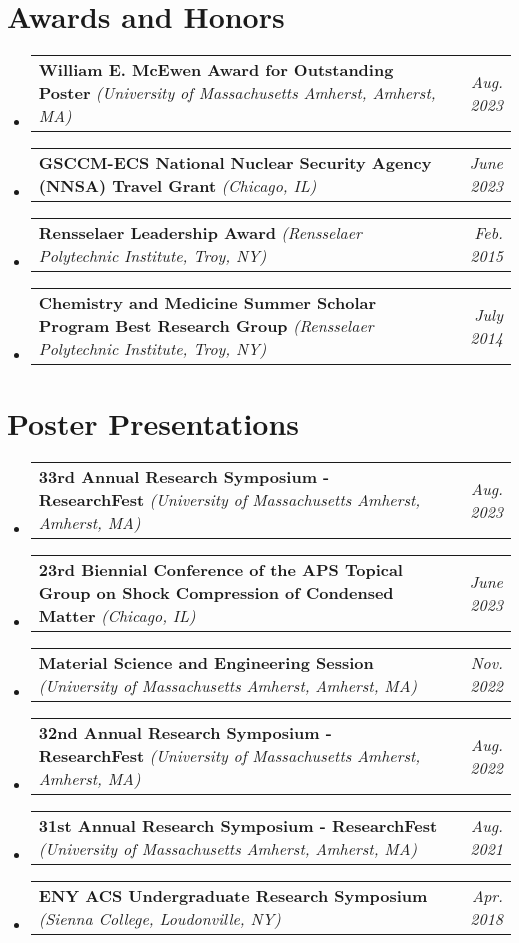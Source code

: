 \documentclass[letterpaper,11pt]{article}
\makeatletter
\newcommand{\award}[3]{
    \vspace{-2pt}
    \scriptsize
    \item[]
    \begin{tabularx}{\textwidth}{l@{\extracolsep{\fill}}r}
        \textbf{#1} \textit{(#2)} & \textit{#3} \\
    \end{tabularx}\vspace{-12pt}
}
\newcommand{\presentation}[3]{
    \vspace{-2pt}
    \scriptsize
    \item[]
    \begin{tabularx}{\textwidth}{l@{\extracolsep{\fill}}r}
        \textbf{#1} \textit{(#2)} & \textit{#3} \\
    \end{tabularx}\vspace{-12pt}
}
\makeatother
\begin{document}
\vspace{2pt}
\section{Awards and Honors}
    \vspace{4pt}
    \begin{itemize}[leftmargin=0pt]
        \award{William E. McEwen Award for Outstanding Poster}{University of Massachusetts Amherst, Amherst, MA}{Aug. 2023}
        \award{GSCCM-ECS National Nuclear Security Agency (NNSA) Travel Grant}{Chicago, IL}{June 2023}
        \award{Rensselaer Leadership Award}{Rensselaer Polytechnic Institute, Troy, NY}{Feb. 2015}
        \award{Chemistry and Medicine Summer Scholar Program Best Research Group}{Rensselaer Polytechnic Institute, Troy, NY}{July 2014}
    \end{itemize}

\vspace{2pt}
\section{Poster Presentations}
    \vspace{4pt}
    \begin{itemize}[leftmargin=0pt]
        \presentation{33rd Annual Research Symposium - ResearchFest}{University of Massachusetts Amherst, Amherst, MA}{Aug. 2023}
        \presentation{23rd Biennial Conference of the APS Topical Group on Shock Compression of Condensed Matter}{Chicago, IL}{June 2023}
        \presentation{Material Science and Engineering Session}{University of Massachusetts Amherst, Amherst, MA}{Nov. 2022}
        \presentation{32nd Annual Research Symposium - ResearchFest}{University of Massachusetts Amherst, Amherst, MA}{Aug. 2022}
        \presentation{31st Annual Research Symposium - ResearchFest}{University of Massachusetts Amherst, Amherst, MA}{Aug. 2021}
        \presentation{ENY ACS Undergraduate Research Symposium}{Sienna College, Loudonville, NY}{Apr. 2018}
    \end{itemize}
    
\vspace{2pt}
\end{document}
